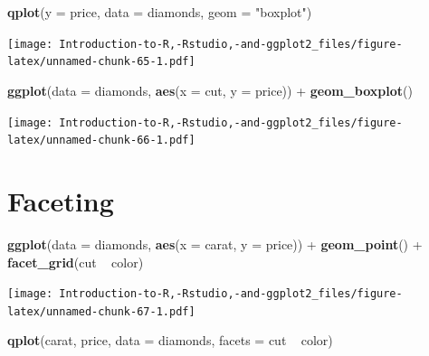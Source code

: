 \documentclass[]{book}
\newenvironment{Shaded}{\begin{snugshade}}{\end{snugshade}}
\newcommand{\KeywordTok}[1]{\textcolor[rgb]{0.13,0.29,0.53}{\textbf{{#1}}}}
\newcommand{\DataTypeTok}[1]{\textcolor[rgb]{0.13,0.29,0.53}{{#1}}}
\newcommand{\StringTok}[1]{\textcolor[rgb]{0.31,0.60,0.02}{{#1}}}
\newcommand{\NormalTok}[1]{{#1}}
\begin{document}
\begin{Shaded}
\begin{Highlighting}[]
\KeywordTok{qplot}\NormalTok{(}\DataTypeTok{y =} \NormalTok{price, }\DataTypeTok{data =} \NormalTok{diamonds, }\DataTypeTok{geom =} \StringTok{"boxplot"}\NormalTok{)}
\end{Highlighting}
\end{Shaded}

\texttt{[image: Introduction-to-R,-Rstudio,-and-ggplot2\_files/figure-latex/unnamed-chunk-65-1.pdf]}

\begin{Shaded}
\begin{Highlighting}[]
\KeywordTok{ggplot}\NormalTok{(}\DataTypeTok{data =} \NormalTok{diamonds, }\KeywordTok{aes}\NormalTok{(}\DataTypeTok{x =} \NormalTok{cut, }\DataTypeTok{y =} \NormalTok{price)) +}\StringTok{ }\KeywordTok{geom_boxplot}\NormalTok{() }
\end{Highlighting}
\end{Shaded}

\texttt{[image: Introduction-to-R,-Rstudio,-and-ggplot2\_files/figure-latex/unnamed-chunk-66-1.pdf]}

\section{Faceting}\label{faceting}

\begin{Shaded}
\begin{Highlighting}[]
\KeywordTok{ggplot}\NormalTok{(}\DataTypeTok{data =} \NormalTok{diamonds, }\KeywordTok{aes}\NormalTok{(}\DataTypeTok{x =} \NormalTok{carat, }\DataTypeTok{y =} \NormalTok{price)) +}\StringTok{ }\KeywordTok{geom_point}\NormalTok{() +}\StringTok{ }\KeywordTok{facet_grid}\NormalTok{(cut ~}\StringTok{ }\NormalTok{color)}
\end{Highlighting}
\end{Shaded}

\texttt{[image: Introduction-to-R,-Rstudio,-and-ggplot2\_files/figure-latex/unnamed-chunk-67-1.pdf]}

\begin{Shaded}
\begin{Highlighting}[]
\KeywordTok{qplot}\NormalTok{(carat, price, }\DataTypeTok{data =} \NormalTok{diamonds, }\DataTypeTok{facets =} \NormalTok{cut ~}\StringTok{ }\NormalTok{color)}
\end{Highlighting}
\end{Shaded}
\end{document}

